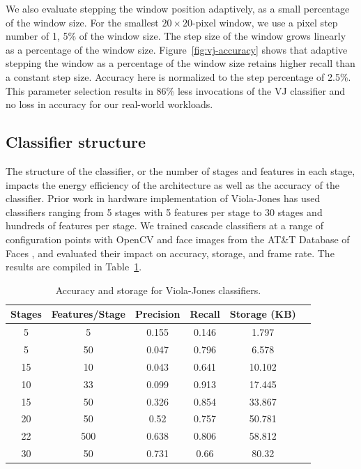 We also evaluate stepping the window
position adaptively, as a small percentage of the window size. For the smallest $20\times 20$-pixel window, we use a
pixel step number of 1, 5\% of the window size. The step size of the window grows linearly as a
percentage of the window size. Figure~\ref{fig:vj-accuracy} shows that adaptive stepping the window as a percentage of the window size retains
higher recall than a constant step size. Accuracy here is normalized to the step percentage
of 2.5\%.
This parameter selection results in 86\% less invocations of the VJ classifier and no loss in accuracy for our real-world workloads.

\subsection{Classifier structure}
The structure of the classifier, or the number of stages and features in each stage,
impacts the energy efficiency of the architecture as well as the accuracy of the
classifier. Prior work in hardware implementation of Viola-Jones has used
classifiers ranging from 5 stages with 5 features per stage to 30 stages and
hundreds of features per stage. We trained cascade classifiers at a range of
configuration points with OpenCV and face images from
the AT\&T Database of Faces \cite{attfaces}, and evaluated their impact on accuracy, storage, and
frame rate. The results are compiled in Table~\ref{table:vj-clsfr-sizes}.

\begin{table}[h]
  \centering
\begin{tabular}{cccccc}
\hline
Stages  & Features/Stage  & Precision & Recall & Storage (KB)  \\ \hline
5       &       5         & 0.155     & 0.146  & 1.797         \\
5     &         50        & 0.047     & 0.796  & 6.578        \\
15    &         10       & 0.043     & 0.641  & 10.102     \\
10    &         33       & 0.099     & 0.913  & 17.445     \\
15    &         50       & 0.326     & 0.854  & 33.867         \\
20    &         50       & 0.52      & 0.757  & 50.781      \\
22    &         500      & 0.638     & 0.806  & 58.812     \\
30    &         50       & 0.731     & 0.66   & 80.32      \\
\hline
\end{tabular}

\caption{Accuracy and storage for Viola-Jones classifiers.}
\label{table:vj-clsfr-sizes}
\end{table}



